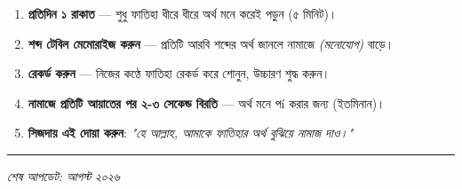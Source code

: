\begin{enumerate}
\item \textbf{প্রতিদিন ১ রাকাত } — শুধু ফাতিহা ধীরে ধীরে অর্থ মনে করেই পড়ুন (৫ মিনিট)।
\item \textbf{শব্দ টেবিল মেমোরাইজ করুন} — প্রতিটি আরবি শব্দের অর্থ জানলে নামাজে \textit{ (মনোযোগ)} বাড়ে।
\item \textbf{রেকর্ড করুন} — নিজের কণ্ঠে ফাতিহা রেকর্ড করে শোনুন, উচ্চারণ শুদ্ধ করুন।
\item \textbf{নামাজে প্রতিটি আয়াতের পর ২-৩ সেকেন্ড বিরতি} — অর্থ মনে পí করার জন্য (ইতমিনান)।
\item \textbf{সিজদায় এই দোয়া করুন}: \textit{"হে আল্লাহ, আমাকে ফাতিহার অর্থ বুঝিয়ে নামাজ দাও।"}
\end{enumerate}
\medskip\hrule\medskip

\textit{শেষ আপডেট: আগস্ট ২০২৬}


